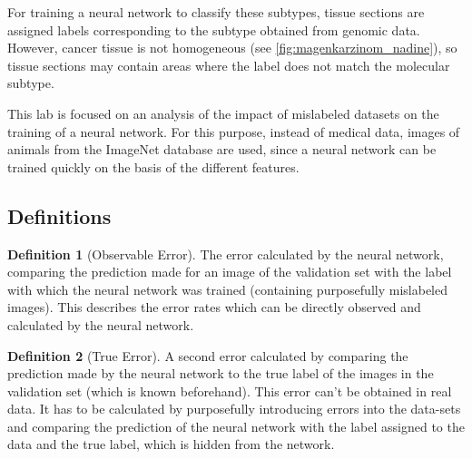 \documentclass[a4paper,11pt]{scrartcl}
\theoremstyle{definition}
\newtheorem{definition}{Definition}[section]
\begin{document}
For training a neural network to classify these subtypes, tissue sections are assigned labels corresponding to the subtype obtained from genomic data.
However, cancer tissue is not homogeneous \cite{de1989gastric} (see \autoref{fig:magenkarzinom_nadine}), so tissue sections may contain areas where the label does not match the molecular subtype.

This lab is focused on an analysis of the impact of mislabeled datasets on the training of a neural network.
For this purpose, instead of medical data, images of animals from the ImageNet database \cite{deng2009imagenet} are used, since a neural network can be trained quickly on the basis of the different features.

\subsection{Definitions}
\label{definitions}
\begin{definition}[Observable Error]\label{def:observableerror}
	The error calculated by the neural network, comparing the prediction made for an image of the validation set with the label with which the neural network was trained (containing purposefully mislabeled images).
	This describes the error rates which can be directly observed and calculated by the neural network.
\end{definition}
\begin{definition}[True Error]\label{def:trueerror}
	A second error calculated by comparing the prediction made by the neural network to the true label of the images in the validation set (which is known beforehand).
	This error can't be obtained in real data.
	It has to be calculated by purposefully introducing errors into the data-sets and comparing the prediction of the neural network with the label assigned to the data and the true label, which is hidden from the network.
\end{definition}
\end{document}
